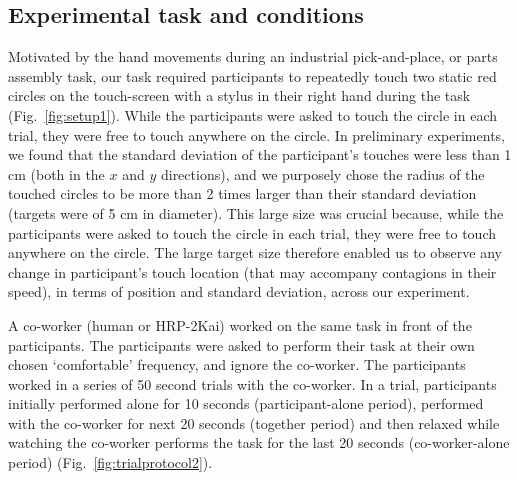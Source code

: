 \documentclass[a4paper, 12pt, oneside]{Thesis}  %
\begin{document}
\subsection{Experimental task and conditions}

Motivated by the hand movements during an industrial pick-and-place, or parts assembly task, our task required participants to repeatedly touch two static red circles on the touch-screen with a stylus in their right hand during the task (Fig.~\ref{fig:setup1}). While the participants were asked to touch the circle in each trial, they were free to touch anywhere on the circle. In preliminary experiments, we found that the standard deviation of the participant's touches were less than 1 cm (both in the $x$ and $y$ directions), and we purposely chose the radius of the touched circles to be more than 2 times larger than their standard deviation (targets were of 5 cm in diameter). This large size was crucial because, while the participants were asked to touch the circle in each trial, they were free to touch anywhere on the circle. The large target size therefore enabled us to observe any change in participant's touch location (that may accompany contagions in their speed), in terms of position and standard deviation, across our experiment. 

A co-worker (human or HRP-2Kai) worked on the same task in front of the participants. The participants were asked to perform their task at their own chosen `comfortable' frequency, and ignore the co-worker. The participants worked in a series of 50 second trials with the co-worker. In a trial, participants initially performed alone for 10 seconds (participant-alone period), performed with the co-worker for next 20 seconds (together period) and then relaxed while watching the co-worker performs the task for the last 20 seconds (co-worker-alone period) (Fig.~\ref{fig:trialprotocol2}).   
\end{document}
